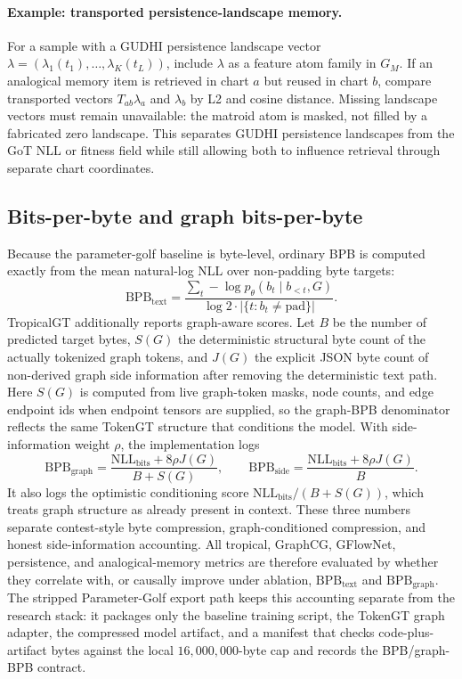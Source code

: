 \documentclass[11pt]{article}
\begin{document}
\paragraph{Example: transported persistence-landscape memory.}
For a sample with a GUDHI persistence landscape vector $\lambda=(\lambda_1(t_1),\ldots,\lambda_K(t_L))$, include $\lambda$ as a feature atom family in $G_M$.  If an analogical memory item is retrieved in chart $a$ but reused in chart $b$, compare transported vectors $T_{ab}\lambda_a$ and $\lambda_b$ by L2 and cosine distance.  Missing landscape vectors must remain unavailable: the matroid atom is masked, not filled by a fabricated zero landscape.  This separates GUDHI persistence landscapes from the GoT NLL or fitness field while still allowing both to influence retrieval through separate chart coordinates.

\subsection{Bits-per-byte and graph bits-per-byte}
Because the parameter-golf baseline is byte-level, ordinary BPB is computed exactly from the mean natural-log NLL over non-padding byte targets:
\[
  \mathrm{BPB}_{\mathrm{text}}=\frac{\sum_t-\log p_\theta(b_t\mid b_{<t},G)}{\log 2\cdot |\{t:b_t\ne\mathrm{pad}\}|}.
\]
TropicalGT additionally reports graph-aware scores.  Let \(B\) be the number of predicted target bytes, \(S(G)\) the deterministic structural byte count of the actually tokenized graph tokens, and \(J(G)\) the explicit JSON byte count of non-derived graph side information after removing the deterministic text path.  Here \(S(G)\) is computed from live graph-token masks, node counts, and edge endpoint ids when endpoint tensors are supplied, so the graph-BPB denominator reflects the same TokenGT structure that conditions the model.  With side-information weight \(\rho\), the implementation logs
\[
  \mathrm{BPB}_{\mathrm{graph}}=\frac{\mathrm{NLL}_{\mathrm{bits}}+8\rho J(G)}{B+S(G)},\qquad
  \mathrm{BPB}_{\mathrm{side}}=\frac{\mathrm{NLL}_{\mathrm{bits}}+8\rho J(G)}{B}.
\]
It also logs the optimistic conditioning score \(\mathrm{NLL}_{\mathrm{bits}}/(B+S(G))\), which treats graph structure as already present in context.  These three numbers separate contest-style byte compression, graph-conditioned compression, and honest side-information accounting.  All tropical, GraphCG, GFlowNet, persistence, and analogical-memory metrics are therefore evaluated by whether they correlate with, or causally improve under ablation, \(\mathrm{BPB}_{\mathrm{text}}\) and \(\mathrm{BPB}_{\mathrm{graph}}\).  The stripped Parameter-Golf export path keeps this accounting separate from the research stack: it packages only the baseline training script, the TokenGT graph adapter, the compressed model artifact, and a manifest that checks code-plus-artifact bytes against the local \(16{,}000{,}000\)-byte cap and records the BPB/graph-BPB contract.
\end{document}
